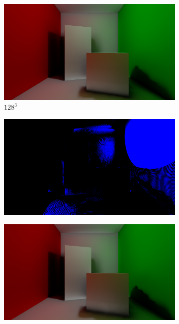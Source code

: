 \begin{figure}[H]
\begin{subfigure}[b]{.49\linewidth}
		\caption*{}
	\end{subfigure}%
	\par\smallskip
	\begin{subfigure}[b]{.49\linewidth}
		\centering
		\captionsetup{justification=centering}
		\includegraphics[width=\linewidth]{media/finals/cornell_gi_128.png}
		\caption*{$128^3$}
	\end{subfigure}%
	\hspace{0.01\textwidth}
	\begin{subfigure}[b]{.49\linewidth}
		\centering
		\captionsetup{justification=centering}
		\includegraphics[width=\linewidth]{media/finals/cornell_gi_128_diff.png}
		\caption*{}
	\end{subfigure}%
	\par\smallskip
	\begin{subfigure}[b]{.49\linewidth}
		\centering
		\captionsetup{justification=centering}
		\includegraphics[width=\linewidth]{media/finals/cornell_gi_64.png}

\end{subfigure}
\end{figure}
